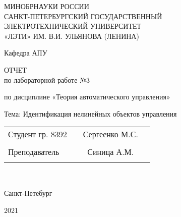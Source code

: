 \begin{titlepage}
\begin{center}
\large
МИНОБРНАУКИ РОССИИ \\
САНКТ-ПЕТЕРБУРГСКИЙ ГОСУДАРСТВЕННЫЙ \\
ЭЛЕКТРОТЕХНИЧЕСКИЙ УНИВЕРСИТЕТ \\
«ЛЭТИ» ИМ. В.И. УЛЬЯНОВА (ЛЕНИНА) \\

\vspace{0.25cm}

Кафедра АПУ


\vfill
\vfill

\textsc{ОТЧЕТ}\\
по лабораторной работе №3

по дисциплине «Теория автоматического управления»

Тема: Идентификация нелинейных объектов управления
\vfill
\vfill

\normalsize{ 
	\begin{tabular}{p{7.67cm} p{4.7cm} cp{5cm}}
		Студент гр. 8392 & \underline{\hspace{4.6cm}} & Сергеенко М.С. \\\\
		Преподаватель & \underline{\hspace{4.6cm}} & Синица А.М. \\\\
	\end{tabular}
}\\
\vfill

	Санкт-Петебург
	
	2021
\end{center}
\end{titlepage}
